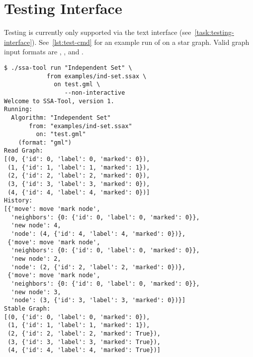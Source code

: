 \section{Testing Interface}
\label{sec:interface-testing}

Testing is currently only supported via the text interface (see~\autoref{task:testing-interface}).
See~\autoref{lst:test-cmd} for an example run of  on a star graph.
Valid graph input formats are , , and .

\begin{lstlisting}[language={},float=!h,caption={A model testing session using the command-line utility.},label={lst:test-cmd}]
$ ./ssa-tool run "Independent Set" \
            from examples/ind-set.ssax \
              on test.gml \
                 --non-interactive
Welcome to SSA-Tool, version 1.
Running:
  Algorithm: "Independent Set"
       from: "examples/ind-set.ssax"
         on: "test.gml"
    (format: "gml")
Read Graph:
[(0, {'id': 0, 'label': 0, 'marked': 0}),
 (1, {'id': 1, 'label': 1, 'marked': 1}),
 (2, {'id': 2, 'label': 2, 'marked': 0}),
 (3, {'id': 3, 'label': 3, 'marked': 0}),
 (4, {'id': 4, 'label': 4, 'marked': 0})]
History:
[{'move': move 'mark node',
  'neighbors': {0: {'id': 0, 'label': 0, 'marked': 0}},
  'new node': 4,
  'node': (4, {'id': 4, 'label': 4, 'marked': 0})},
 {'move': move 'mark node',
  'neighbors': {0: {'id': 0, 'label': 0, 'marked': 0}},
  'new node': 2,
  'node': (2, {'id': 2, 'label': 2, 'marked': 0})},
 {'move': move 'mark node',
  'neighbors': {0: {'id': 0, 'label': 0, 'marked': 0}},
  'new node': 3,
  'node': (3, {'id': 3, 'label': 3, 'marked': 0})}]
Stable Graph:
[(0, {'id': 0, 'label': 0, 'marked': 0}),
 (1, {'id': 1, 'label': 1, 'marked': 1}),
 (2, {'id': 2, 'label': 2, 'marked': True}),
 (3, {'id': 3, 'label': 3, 'marked': True}),
 (4, {'id': 4, 'label': 4, 'marked': True})]
\end{lstlisting}

